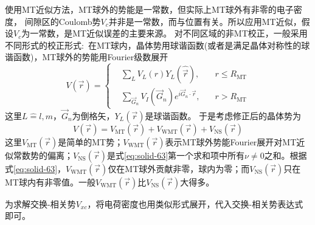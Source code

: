{使用MT近似方法，MT球外的势能是一常数，但实际上MT球外有非零的电子密度，%
间隙区的Coulomb势$V_c$并非是一常数，而与位置有关。所以应用MT近似，假设$V_c$为一常数，是MT近似误差的主要来源。 
对不同区域的非MT校正，一般采用不同形式的校正形式:~在MT球内，晶体势用球谐函数(或者是满足晶体对称性的球谐函数)，MT球外的势能用Fourier级数展开%
\begin{equation}
  V(\vec r)=\left\{
  \begin{aligned}
	  &\sum_LV_L(r)Y_L(\hat{\vec r}),\quad &r\leqslant R_{\mathrm{MT}}\\
	  &\sum_{\vec G_n}V_I(\vec G_n)e^{i\vec G_n\cdot\vec r},&r>R_{\mathrm{MT}}
  \end{aligned}\right.
  \label{eq:solid-63}
\end{equation}
这里$L\hat=l,m$，$\vec G_n$为倒格矢，$Y_L(\vec r)$是球谐函数。%
于是考虑修正后的晶体势为
\begin{equation}
	V(\vec r)=V_{\mathrm{MT}}(\vec r)+V_{\mathrm{WMT}}(\vec r)+V_{\mathrm{NS}}(\vec r)
  \label{eq:solid-64}
\end{equation}
这里$V_{\mathrm{MT}}(\vec r)$是简单的MT势；$V_{\mathrm{WMT}}(\vec r)$表示MT球外势能Fourier展开对MT近似常数势的偏离；$V_{\mathrm{NS}}(\vec r)$是式\eqref{eq:solid-63}第一个求和项中所有$\nu$$\neq$0之和。根据式\eqref{eq:solid-63}，$V_{\mathrm{WMT}}(\vec r)$仅在MT球外贡献非零，球内为零；而$V_{\mathrm{NS}}(\vec r)$只在MT球内有非零值。一般$V_{\mathrm{WMT}}(\vec r)$比$V_{\mathrm{NS}}(\vec r)$大得多。

为求解交换-相关势$V_{xc}$，将电荷密度也用类似形式展开，代入交换-相关势表达式即可。

}
